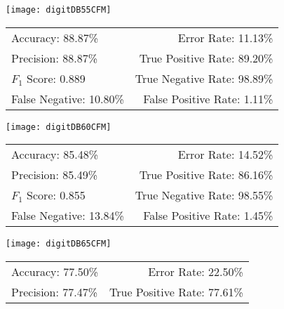 \begin{landscape}
	\begin{figure}[!h]
		
		\begin{minipage}[c]{.33\linewidth}
			\centering
			\texttt{[image: digitDB55CFM]}
			\tiny
			\begin{tabular}{lr}
				\toprule
				Accuracy: 88.87\% & \hspace{-.00in} Error Rate: 11.13\% \\
				Precision: 88.87\% & \hspace{-.00in} True Positive Rate: 89.20\% \\
				$F_1$ Score: 0.889 & \hspace{-.00in} True Negative Rate: 98.89\% \\
				False Negative: 10.80\% & \hspace{-.00in} False Positive Rate: 1.11\% \\
				\bottomrule
			\end{tabular}
		\end{minipage}
		\begin{minipage}[c]{.33\linewidth}
			\centering
			\texttt{[image: digitDB60CFM]}
			\tiny
			\begin{tabular}{lr}
				\toprule
				Accuracy: 85.48\% & \hspace{-.00in} Error Rate: 14.52\% \\
				Precision: 85.49\% & \hspace{-.00in} True Positive Rate: 86.16\% \\
				$F_1$ Score: 0.855 & \hspace{-.00in} True Negative Rate: 98.55\% \\
				False Negative: 13.84\% & \hspace{-.00in} False Positive Rate: 1.45\% \\
				\bottomrule
			\end{tabular}
		\end{minipage}
		\begin{minipage}[c]{.33\linewidth}
			\centering
			\texttt{[image: digitDB65CFM]}
			\tiny
			\begin{tabular}{lr}
				\toprule
				Accuracy: 77.50\% & \hspace{-.00in} Error Rate: 22.50\% \\
				Precision: 77.47\% & \hspace{-.00in} True Positive Rate: 77.61\% \\

\end{tabular}
\end{minipage}
\end{figure}
\end{landscape}
